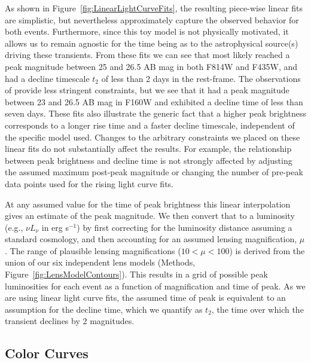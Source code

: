 As shown in Figure~\ref{fig:LinearLightCurveFits}, the resulting
piece-wise linear fits are simplistic, but nevertheless approximately
capture the observed behavior for both events.  Furthermore, since
this toy model is not physically motivated, it allows us to remain
agnostic for the time being as to the astrophysical source(s) driving
these transients.  From these fits we can see that \spockone most
likely reached a peak magnitude between 25 and 26.5 AB mag in both
F814W and F435W, and had a decline timescale $t_2$ of less than 2 days
in the rest-frame. The observations of \spocktwo provide less
stringent constraints, but we see that it had a peak magnitude between
23 and 26.5 AB mag in F160W and exhibited a decline time of less than
seven days.  These fits also illustrate the generic fact that a higher
peak brightness corresponds to a longer rise time and a faster decline
timescale, independent of the specific model used.  Changes to the
arbitrary constraints we placed on these linear fits do not
substantially affect the results.  For example, the relationship
between peak brightness and decline time is not strongly affected by
adjusting the assumed maximum post-peak magnitude or changing the
number of pre-peak data points used for the rising light curve fits.

At any assumed value for the time of peak brightness this linear
interpolation gives an estimate of the peak magnitude. We then convert
that to a luminosity (e.g., $\nu L_\nu$ in erg s$^{-1}$) by first
correcting for the luminosity distance assuming a standard \LCDM
cosmology, and then accounting for an assumed lensing magnification,
$\mu$.  The range of plausible lensing magnifications ($10<\mu<100$)
is derived from the union of our six independent lens models (Methods,
Figure~\ref{fig:LensModelContours}).  This results in a grid of
possible peak luminosities for each event as a function of
magnification and time of peak.  As we are using linear light curve
fits, the assumed time of peak is equivalent to an assumption for the
decline time, which we quantify as $t_2$, the time over which the
transient declines by 2 magnitudes.



\subsection{Color Curves}\label{sec:ColorCurves}

